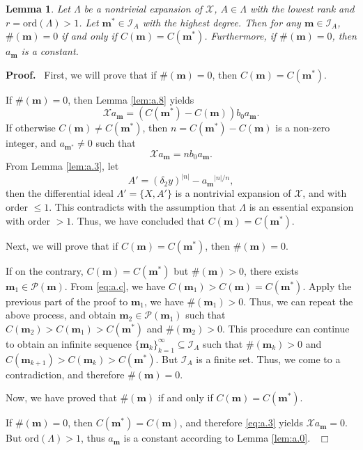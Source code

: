 \documentclass[preprint,12pt]{elsarticle}
\newtheorem{lem}[thm]{Lemma}
\newenvironment{proof}[1][Proof]{\textbf{#1.}\ }{\ $\Box$}
\begin{document}
\begin{lem}
\label{lem:a.10}
Let $\Lambda$ be a nontrivial expansion of $\mathscr{X}$, $A\in \Lambda$ with the lowest rank and $r =
\mathrm{ord}(\Lambda) > 1$. Let $\mathbf{m}^*\in \mathcal{I}_A$ with the highest
degree. Then for any $\mathbf{m}\in \mathcal{I}_A$, $\#(\mathbf{m})=0$ if
and only if $C(\mathbf{m}) = C(\mathbf{m}^*)$. Furthermore, if
$\#(\mathbf{m})=0$, then $a_{\mathbf{m}}$ is a constant.
\end{lem}
\begin{proof} First, we will prove that if $\#(\mathbf{m}) = 0$, then $C(\mathbf{m}) = C(\mathbf{m}^*)$.

If $\#(\mathbf{m}) = 0$,  then Lemma \ref{lem:a.8} yields
$$\mathscr{X}a_{\mathbf{m}} = (C({\mathbf{m}^*}) -
C({\mathbf{m}}))b_0a_{\mathbf{m}}.$$ 
If otherwise $C({\mathbf{m}})\not=C({\mathbf{m}^*})$, then $n = C(\mathbf{m}^*) -
C(\mathbf{m})$ is a non-zero integer, and $a_{\mathbf{m}^*}\not=0$ such that
$$\mathscr{X}a_{\mathbf{m}}
 = n b_0 a_{\mathbf{m}}.$$
 From Lemma \ref{lem:a.3}, let
 $$A' = (\delta_2 y)^{|n|} - {a_{\mathbf{m}}}^{|n|/n},$$
 then the differential ideal $\Lambda' = \{X,A'\}$ is a nontrivial expansion of $\mathscr{X}$, and with order $\leq 1$.  This contradicts with the assumption that $\Lambda$ is an essential expansion with order $> 1$.  Thus, we have concluded that $C(\mathbf{m}) =
 C(\mathbf{m}^*)$.

Next, we will prove that if $C(\mathbf{m}) = C(\mathbf{m}^*)$, then $\#(\mathbf{m}) = 0$. 

If on the contrary, $C(\mathbf{m}) = C(\mathbf{m}^*)$ but $\#(\mathbf{m})>0$,  there exists $\mathbf{m}_1\in
 \mathcal{P}(\mathbf{m})$. From \eqref{eq:a.c}, we have $C(\mathbf{m}_1) > C(\mathbf{m}) =
 C(\mathbf{m}^*)$.  Apply the previous part of the proof to $\mathbf{m}_1$, we have $\#(\mathbf{m}_1) > 0$. Thus, we can repeat the above process, and obtain $\mathbf{m}_2\in \mathcal{P}(\mathbf{m}_1)$ such that $C(\mathbf{m}_2) > C(\mathbf{m}_1)>C(\mathbf{m}^*)$ and $\#(\mathbf{m}_2) > 0$.  This procedure can continue to obtain an infinite sequence $\{\mathbf{m}_k\}_{k=1}^\infty \subseteq \mathcal{I}_A$ such that $\#(\mathbf{m}_k) > 0$ and $C(\mathbf{m}_{k+1}) > C(\mathbf{m}_k)  > C(\mathbf{m}^*)$. But $\mathcal{I}_A$ is a finite set. Thus, we come to a contradiction, and therefore $\#(\mathbf{m}) = 0$.
 
 
Now, we have  proved that $\#(\mathbf{m})$ if and only if $C(\mathbf{m}) = C(\mathbf{m}^*)$.

If $\#(\mathbf{m}) = 0$, then $C(\mathbf{m}^*) = C(\mathbf{m})$, and therefore
\eqref{eq:a.3} yields $\mathscr{X}a_{\mathbf{m}} = 0$. But
$\mathrm{ord}(\Lambda)
> 1$, thus $a_{\mathbf{m}}$ is a constant according to Lemma \ref{lem:a.0}.
\end{proof}
\end{document}
